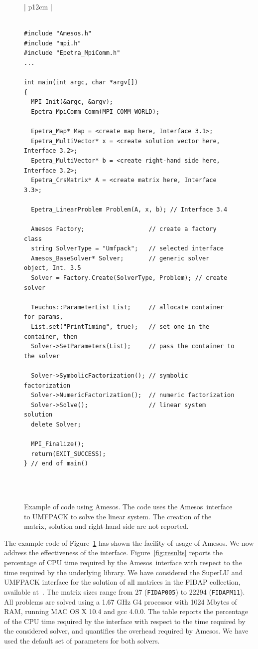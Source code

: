 \documentclass{llncs}
\newcommand{\amesos}{{\sc Amesos}}
\begin{document}
\begin{figure}
\begin{center}
\begin{tabular}{| p{12cm} | }
\hline
 \\ $\,$
\begin{minipage}{11.8cm}
\begin{verbatim}
#include "Amesos.h"
#include "mpi.h"
#include "Epetra_MpiComm.h"
...

int main(int argc, char *argv[])
{
  MPI_Init(&argc, &argv);
  Epetra_MpiComm Comm(MPI_COMM_WORLD);

  Epetra_Map* Map = <create map here, Interface 3.1>;
  Epetra_MultiVector* x = <create solution vector here, Interface 3.2>;
  Epetra_MultiVector* b = <create right-hand side here, Interface 3.2>;
  Epetra_CrsMatrix* A = <create matrix here, Interface 3.3>;

  Epetra_LinearProblem Problem(A, x, b); // Interface 3.4

  Amesos Factory;                  // create a factory class
  string SolverType = "Umfpack";   // selected interface
  Amesos_BaseSolver* Solver;       // generic solver object, Int. 3.5
  Solver = Factory.Create(SolverType, Problem); // create solver

  Teuchos::ParameterList List;     // allocate container for params,
  List.set("PrintTiming", true);   // set one in the container, then
  Solver->SetParameters(List);     // pass the container to the solver

  Solver->SymbolicFactorization(); // symbolic factorization
  Solver->NumericFactorization();  // numeric factorization
  Solver->Solve();                 // linear system solution
  delete Solver;

  MPI_Finalize();
  return(EXIT_SUCCESS);
} // end of main()
\end{verbatim}
\end{minipage} \\
 \\
 \hline
\end{tabular}
\caption{Example of code using \amesos. The code uses the \amesos\ interface to
  UMFPACK to solve the linear system. The creation of the matrix, solution and
    right-hand side are not reported.}
\label{fig:example}
\end{center}
\end{figure}

The example code of Figure~\ref{fig:example} has shown the facility of usage
of \amesos. We now address the effectiveness of the interface.
Figure~\ref{fig:results} reports the percentage of CPU time required by the
\amesos\ interface with respect to the time required by the underlying
library. We have considered the SuperLU and UMFPACK interface for the solution
of all matrices in the FIDAP collection, available
at~\cite{boisvert97matrix}. The matrix sizes range from 27
({\tt FIDAP005}) to 22294 ({\tt FIDAPM11}). All problems are solved using a
1.67 GHz G4 processor with 1024 Mbytes of RAM, running MAC OS X 10.4 and gcc
4.0.0. The table reports the percentage of the CPU time required by the
interface with respect to the time required by the considered solver, and
quantifies the overhead required by \amesos. We have used the default set of
parameters for both solvers.
\end{document}
